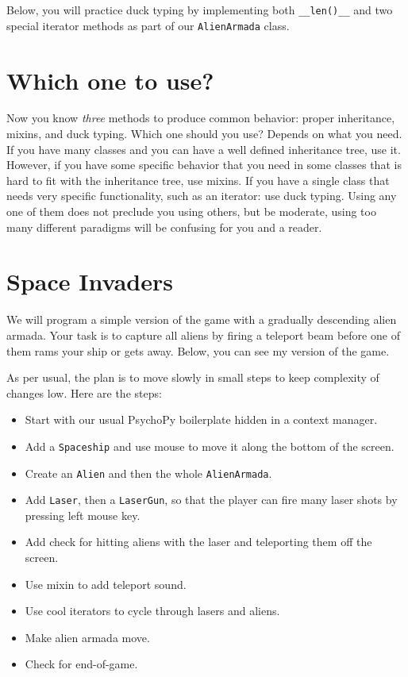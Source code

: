 \documentclass[
]{book}
\providecommand{\tightlist}{%
  \setlength{\itemsep}{0pt}\setlength{\parskip}{0pt}}
\begin{document}
Below, you will practice duck typing by implementing both \texttt{\_\_len()\_\_} and two special iterator methods as part of our \texttt{AlienArmada} class.

\hypertarget{which-one-to-use}{%
\section{Which one to use?}\label{which-one-to-use}}

Now you know \emph{three} methods to produce common behavior: proper inheritance, mixins, and duck typing. Which one should you use? Depends on what you need. If you have many classes and you can have a well defined inheritance tree, use it. However, if you have some specific behavior that you need in some classes that is hard to fit with the inheritance tree, use mixins. If you have a single class that needs very specific functionality, such as an iterator: use duck typing. Using any one of them does not preclude you using others, but be moderate, using too many different paradigms will be confusing for you and a reader.

\hypertarget{space-invaders-1}{%
\section{Space Invaders}\label{space-invaders-1}}

We will program a simple version of the game with a gradually descending alien armada. Your task is to capture all aliens by firing a teleport beam before one of them rams your ship or gets away. Below, you can see my version of the game.

As per usual, the plan is to move slowly in small steps to keep complexity of changes low. Here are the steps:

\begin{itemize}
\tightlist
\item
  Start with our usual PsychoPy boilerplate hidden in a context manager.
\item
  Add a \texttt{Spaceship} and use mouse to move it along the bottom of the screen.
\item
  Create an \texttt{Alien} and then the whole \texttt{AlienArmada}.
\item
  Add \texttt{Laser}, then a \texttt{LaserGun}, so that the player can fire many laser shots by pressing left mouse key.
\item
  Add check for hitting aliens with the laser and teleporting them off the screen.
\item
  Use mixin to add teleport sound.
\item
  Use cool iterators to cycle through lasers and aliens.
\item
  Make alien armada move.
\item
  Check for end-of-game.
\end{itemize}
\end{document}
